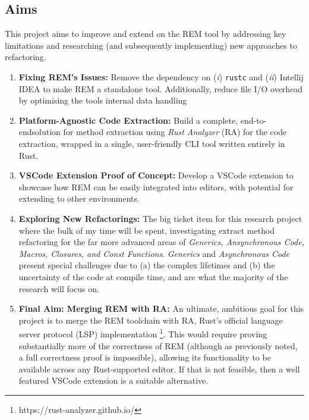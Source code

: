 \subsection*{Aims}

This project aims to improve and extend on the REM tool by addressing key
limitations and researching (and subsequently implementing) new approaches to
refactoring.
\begin{enumerate}
    \item \textbf{Fixing REM's Issues:} Remove the dependency on (\textit{i})
    \verb|rustc| and (\textit{ii}) Intellij IDEA to make REM a standalone tool.
    Additionally, reduce file I/O overhead by optimising the tools internal data
    handling
    \item \textbf{Platform-Agnostic Code Extraction:} Build a complete,
    end-to-endsolution for method extraction using \textit{Rust Analyzer} (RA)
    for the code extraction, wrapped in a single, user-friendly CLI tool written
    entirely in Rust.
    \item \textbf{VSCode Extension Proof of Concept:} Develop a VSCode extension
    to showcase how REM can be easily integrated into editors, with potential
    for extending to other environments.
    \item \textbf{Exploring New Refactorings:} The big ticket item for this
    research project where the bulk of my time will be spent, investigating
    extract method refactoring for the far more advanced areas of
    \textit{Generics, Ansynchronous Code, Macros, Closures, and Const
    Functions}. \textit{Generics} and \textit{Asynchronous Code} present special
    challenges due to (a) the complex lifetimes and (b) the uncertainty of the
    code at compile time, and are what the majority of the research will focus
    on.
    \item \textbf{Final Aim: Merging REM with RA:} An ultimate, ambitious goal
    for this project is to merge the REM toolchain with RA, Rust's official
    language server protocol (LSP) implementation
    \footnote{https://rust-analyzer.github.io/}. This would require proving
    substantially more of the correctness of REM (although as previously noted,
    a full correctness proof is impossible), allowing its functionality to be
    available across any Rust-supported editor. If that is not feasible, then a
    well featured VSCode extension is a suitable alternative.
\end{enumerate}